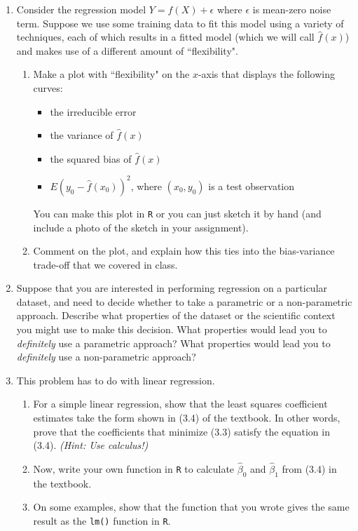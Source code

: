 \documentclass[12pt]{article}
\begin{document}
\begin{enumerate}
 
\item  Consider the regression model $Y=f(X)+\epsilon$ where $\epsilon$ is mean-zero noise term.  Suppose we use some training data to fit this model using a variety of techniques, each of which results in a fitted model (which we will call $\hat{f}(x)$) and makes use of a different amount of ``flexibility". 
\begin{enumerate} 
\item Make a plot with ``flexibility" on the $x$-axis that displays the following curves:
\begin{itemize}
\item the irreducible error
\item the variance of $\hat{f}(x)$
\item the squared bias of $\hat{f}(x)$
\item $E(y_0 - \hat{f}(x_0))^2$, where $(x_0, y_0)$ is a test observation
\end{itemize}
You can make this plot in \verb=R= or you can just sketch it by hand (and include a photo of the sketch in your assignment).
 \item Comment on the plot, and explain how this ties into the bias-variance trade-off that we covered in class.
\end{enumerate}


\item Suppose that you are interested in performing regression on a particular dataset, and need to decide whether to take a parametric or a non-parametric approach. Describe what properties of the dataset or the scientific context you might use to make this decision. What properties would lead you to \emph{definitely} use a parametric approach? What properties would lead you to \emph{definitely} use a non-parametric approach? 

\item This problem has to do with linear regression. 
\begin{enumerate}
\item For a simple linear regression, 
show that the least squares coefficient estimates take the form shown in (3.4) of the textbook. In other words, prove that the coefficients that minimize (3.3) satisfy the equation in (3.4). \emph{(Hint: Use calculus!)}
\item  Now, write your own function in \verb=R= to calculate $\hat\beta_0$ and $\hat\beta_1$ from (3.4) in the textbook. 
\item On some examples, show that the function that you wrote gives the same result as the \verb=lm()= function in \verb=R=.
\end{enumerate}



\end{enumerate}
\end{document}
